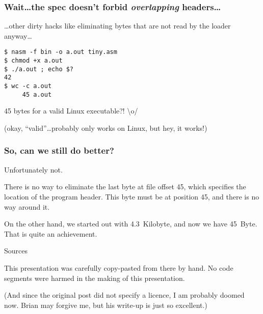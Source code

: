 \documentclass{beamer}
\begin{document}
\begin{frame}[fragile]
\frametitle{Wait\ldots the spec doesn't forbid \emph{overlapping} headers\ldots}
\ldots other dirty hacks like eliminating bytes that are not read by the loader
anyway\ldots
\begin{lstlisting}
$ nasm -f bin -o a.out tiny.asm
$ chmod +x a.out
$ ./a.out ; echo $?
42
$ wc -c a.out
     45 a.out
\end{lstlisting}

45 bytes for a valid Linux executable?! \textbackslash{}o/

(okay, ``valid''\ldots probably only works on Linux, but hey, it works!)
\end{frame}

\begin{frame}[fragile]
\frametitle{So, can we still do better?}
Unfortunately not.

There is no way to eliminate the last byte at file offset 45, which specifies
the location of the program header. This byte must be at position 45, and there
is no way around it.

On the other hand, we started out with 4.3~Kilobyte, and now we have 45~Byte.
That is quite an achievement.
\end{frame}

\begin{frame}{Sources}
\hfill
\small
\begin{thebibliography}{9}
\end{thebibliography}

\hfill

This presentation was carefully copy-pasted from there by hand. No code segments
were harmed in the making of this presentation.

(And since the original post did not specify a licence, I am probably doomed
now. Brian may forgive me, but his write-up is just so excellent.)
\hfill
\end{frame}
\end{document}
